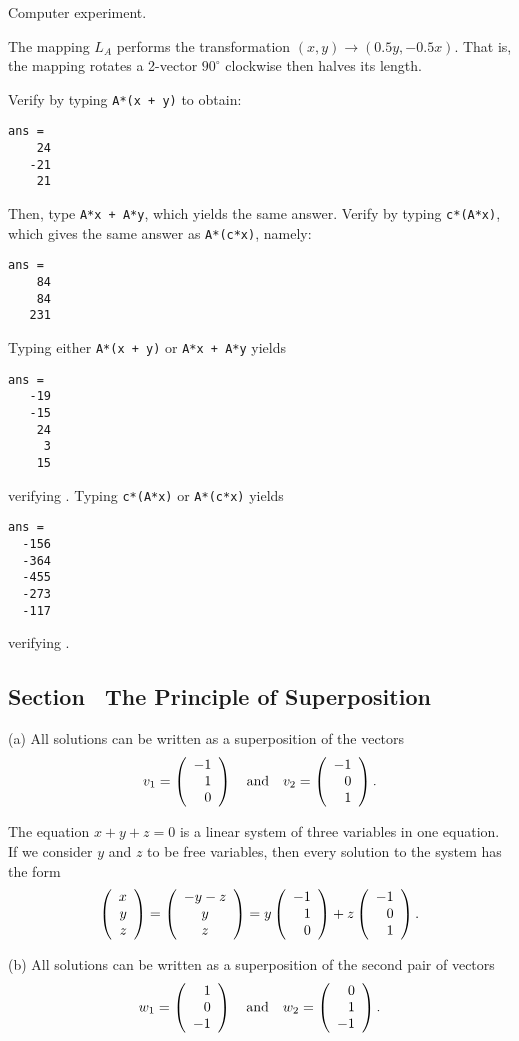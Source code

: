 \documentclass{ximera}
\begin{document}
  Computer experiment.

The mapping $L_A$ performs the transformation $(x,y) \rightarrow
(0.5y, -0.5x)$.  That is, the mapping rotates a 2-vector
$90^\circ$ clockwise then halves its length.

 Verify  by typing {\tt A*(x + y)} to obtain:
\begin{verbatim}
ans =
    24
   -21
    21
\end{verbatim}
Then, type {\tt A*x + A*y}, which yields the same answer.
Verify  by typing {\tt c*(A*x)}, which gives
the same answer as {\tt A*(c*x)}, namely:
\begin{verbatim}
ans =
    84
    84
   231
\end{verbatim}

 Typing either {\tt A*(x + y)} or {\tt A*x + A*y} yields
\begin{verbatim}
ans =
   -19
   -15
    24
     3
    15
\end{verbatim}
verifying .  Typing {\tt c*(A*x)} or {\tt A*(c*x)} yields
\begin{verbatim}
ans =
  -156
  -364
  -455
  -273
  -117
\end{verbatim}
verifying .



\subsection*{Section~\protect{\ref{S:Superposition}} The Principle of
Superposition}

(a) \ans All solutions can be written as a superposition of the vectors
\[
v_1 = \left(\begin{array}{r} -1 \\ 1 \\ 0\end{array}\right) \quad\mbox{and}\quad v_2 = \left(\begin{array}{r} -1 \\ 0 \\ 1\end{array}\right).
\]

\soln The equation $x + y + z = 0$ is a linear system of three variables
in one equation.  If we consider $y$ and $z$ to be free variables, then
every solution to the system has the form
\[
\left(\begin{array}{r} x \\ y \\ z\end{array}\right) = \left(\begin{array}{c} -y - z \\ y \\
z \end{array}\right) = y\left(\begin{array}{r} -1 \\ 1 \\ 0\end{array}\right) +
z\left(\begin{array}{r} -1 \\ 0 \\ 1\end{array}\right).
\]

(b) \ans All solutions can be written as a superposition
of the second pair of vectors
\[
w_1 = \left(\begin{array}{r} 1 \\ 0 \\ -1\end{array}\right) \quad\mbox{and}\quad w_2 = \left(\begin{array}{r} 0 \\ 1 \\ -1\end{array}\right).
\]
\end{document}
